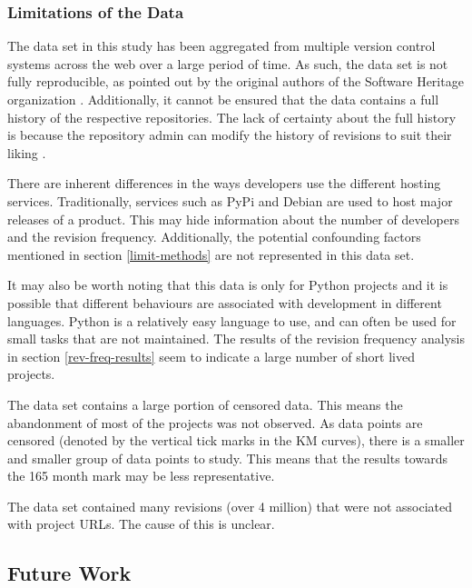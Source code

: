\documentclass[acmconf]{acmart}
\begin{document}
\subsubsection{Limitations of the Data}

The data set in this study has been aggregated from multiple version control systems across the web over a large period of time.
As such, the data set is not fully reproducible, as pointed out by the original authors of the Software Heritage organization \cite{pietri2019software}.
Additionally, it cannot be ensured that the data contains a full history of the respective repositories.
The lack of certainty about the full history is because the repository admin can modify the history of revisions to suit their liking \cite{perils2009}.

There are inherent differences in the ways developers use the different hosting services.
Traditionally, services such as PyPi and Debian are used to host major releases of a product.
This may hide information about the number of developers and the revision frequency.
Additionally, the potential confounding factors mentioned in section \ref{limit-methods} are not represented in this data set.

It may also be worth noting that this data is only for Python projects and it is possible that different behaviours are associated with development in different languages.
Python is a relatively easy language to use, and can often be used for small tasks that are not maintained.
The results of the revision frequency analysis in section \ref{rev-freq-results} seem to indicate a large number of short lived projects.

The data set contains a large portion of censored data.
This means the abandonment of most of the projects was not observed.
As data points are censored (denoted by the vertical tick marks in the KM curves), there is a smaller and smaller group of data points to study.
This means that the results towards the 165 month mark may be less representative.

The data set contained many revisions (over 4 million) that were not associated with project URLs.
The cause of this is unclear.

\subsection{Future Work} \label{future}
\end{document}
